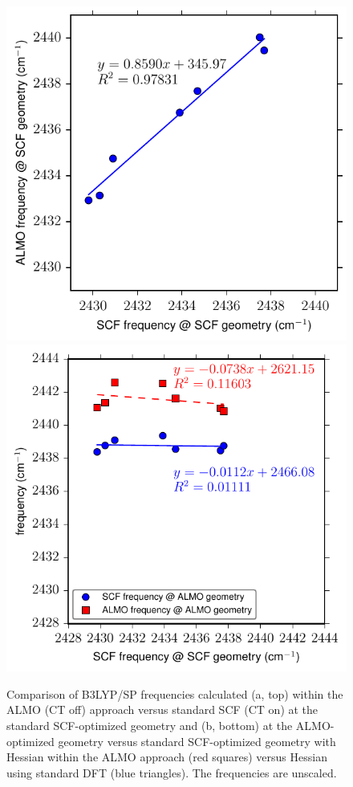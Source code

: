 \begin{figure}
  \centering
  \includegraphics[scale=0.91]{paper_02/Fig2a.pdf}
  \includegraphics[scale=0.91]{paper_02/Fig2b.pdf}
  \caption[Correlation of \texorpdfstring{ \(\nu_3\)}{carbon dioxide asymmetric stretch} frequencies with CT mechanisms]{Comparison of B3LYP/SP frequencies calculated (a, top) within the ALMO (CT off) approach versus standard SCF (CT on) at the standard SCF-optimized geometry and (b, bottom) at the ALMO-optimized geometry versus standard SCF-optimized geometry with Hessian within the ALMO approach (red squares) versus Hessian using standard DFT (blue triangles). The frequencies are unscaled.}
  \label{paper_02:fig:2}
\end{figure}

